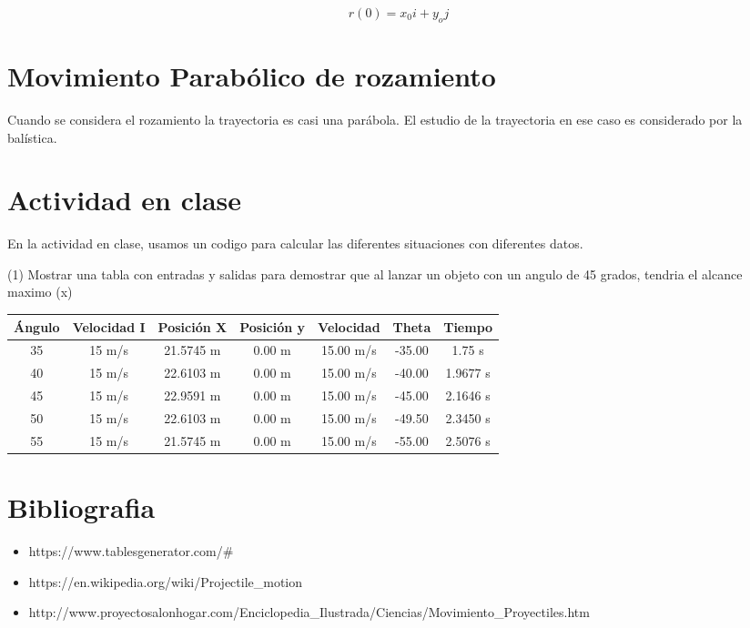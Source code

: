 \documentclass{article}
\begin{document}
\begin{equation}
    r(0) = x_0i + y_oj
\end{equation}

\section{Movimiento Parabólico de rozamiento}
Cuando se considera el rozamiento la trayectoria es casi una parábola. El estudio de la trayectoria en ese caso es considerado por la balística.

\section{Actividad en clase}

En la actividad en clase, usamos un codigo para calcular las diferentes situaciones con diferentes datos.

(1) Mostrar una tabla con entradas y salidas para demostrar que al lanzar un objeto con un angulo de 45 grados, tendria el alcance maximo (x)

\begin{table}[]
\begin{tabular}{|c|c|c|c|c|c|c|}
\hline
\textbf{Ángulo} & \textbf{Velocidad I} & \textbf{Posición X} & \textbf{Posición y} & \textbf{Velocidad} & \textbf{Theta} & \textbf{Tiempo} \\ \hline
35              & 15 m/s               & 21.5745 m           & 0.00 m              & 15.00 m/s          & -35.00         & 1.75 s          \\ \hline
40              & 15 m/s               & 22.6103 m           & 0.00 m              & 15.00 m/s          & -40.00         & 1.9677 s        \\ \hline
45              & 15 m/s               & 22.9591 m           & 0.00 m              & 15.00 m/s          & -45.00         & 2.1646 s        \\ \hline
50              & 15 m/s               & 22.6103 m           & 0.00 m              & 15.00 m/s          & -49.50         & 2.3450 s        \\ \hline
55              & 15 m/s               & 21.5745 m           & 0.00 m              & 15.00 m/s          & -55.00         & 2.5076 s        \\ \hline
\end{tabular}
\end{table}

\section{Bibliografia}

\begin{itemize}
    \item https://www.tablesgenerator.com/#
    \item https://en.wikipedia.org/wiki/Projectile_motion
    \item http://www.proyectosalonhogar.com/Enciclopedia_Ilustrada/Ciencias/Movimiento_Proyectiles.htm
    
\end{itemize} 
\end{document}

